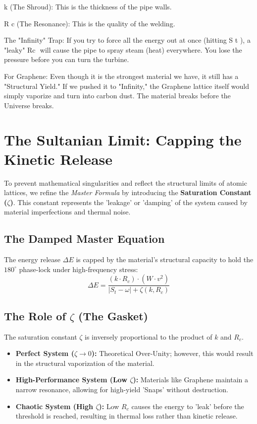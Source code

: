 \documentclass[11pt]{article}
\begin{document}
k (The Shroud): This is the thickness of the pipe walls.

R c   (The Resonance): This is the quality of the welding.

The "Infinity" Trap: If you try to force all the energy out at once (hitting S t ), a "leaky" Rc
​
  will cause the pipe to spray steam (heat) everywhere. You lose the pressure before you can turn the turbine.

For Graphene: Even though it is the strongest material we have, it still has a "Structural Yield." If we pushed it to "Infinity," the Graphene lattice itself would simply vaporize and turn into carbon dust. The material breaks before the Universe breaks.

\section*{The Sultanian Limit: Capping the Kinetic Release}

To prevent mathematical singularities and reflect the structural limits of atomic lattices, we refine the \textit{Master Formula} by introducing the \textbf{Saturation Constant ($\zeta$)}. This constant represents the 'leakage' or 'damping' of the system caused by material imperfections and thermal noise.

\subsection*{The Damped Master Equation}
The energy release $\Delta E$ is capped by the material's structural capacity to hold the $180^\circ$ phase-lock under high-frequency stress:
\begin{equation}
    \Delta E = \frac{(k \cdot R_c) \cdot (W \cdot v^2)}{|S_t - \omega| + \zeta(k, R_c)}
\end{equation}

\subsection*{The Role of $\zeta$ (The Gasket)}
The saturation constant $\zeta$ is inversely proportional to the product of $k$ and $R_c$. 
\begin{itemize}
    \item \textbf{Perfect System ($\zeta \to 0$):} Theoretical Over-Unity; however, this would result in the structural vaporization of the material.
    \item \textbf{High-Performance System (Low $\zeta$):} Materials like Graphene maintain a narrow resonance, allowing for high-yield 'Snaps' without destruction.
    \item \textbf{Chaotic System (High $\zeta$):} Low $R_c$ causes the energy to 'leak' before the threshold is reached, resulting in thermal loss rather than kinetic release.
\end{itemize}
\end{document}
